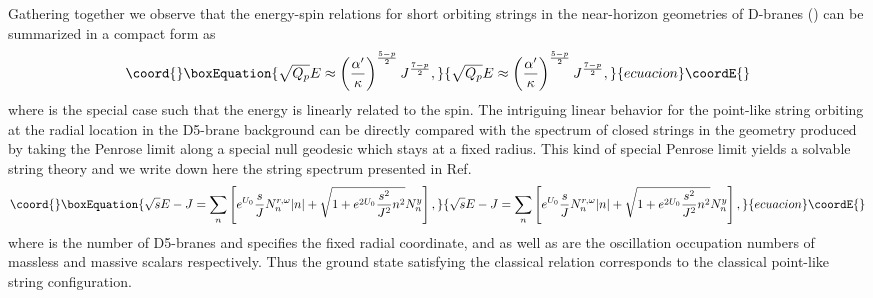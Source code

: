 \documentclass[12pt,a4paper]{article}
\providecommand{\ka}{\kappa}
\begin{document}
Gathering together we observe that the energy-spin relations for short
orbiting strings in the near-horizon geometries of D\coordHE{}-branes
(\coordHE{}) can be summarized in a compact form as
\begin{equation}\coord{}\boxEquation{
\sqrt{Q_p}E \approx \left(\frac{\alpha'}{\ka}\right)^{\frac{5-p}{2}}
J^{\frac{7-p}{2}},
}{
\sqrt{Q_p}E \approx \left(\frac{\alpha'}{\ka}\right)^{\frac{5-p}{2}}
J^{\frac{7-p}{2}},
}{ecuacion}\coordE{}\end{equation}
where \coordHE{} is the special case such that the energy is linearly related
to the spin. The intriguing linear behavior \coordHE{}
for the point-like string orbiting at the radial location \coordHE{}
in the D5-brane background can be directly compared with the
spectrum of closed strings in the geometry produced by taking the
Penrose limit along a special null geodesic which stays at a fixed 
radius. This kind of special Penrose limit yields a solvable string
theory and we write down here the string spectrum presented 
in Ref. \cite{OS}
\begin{equation}\coord{}\boxEquation{
\sqrt{s}E - J = \sum_n \left[ e^{U_0} \frac{s}{J}N_n^{r,\omega}|n| +
\sqrt{1+e^{2U_0}\frac{s^2}{J^2}n^2}N_n^y \right],
}{
\sqrt{s}E - J = \sum_n \left[ e^{U_0} \frac{s}{J}N_n^{r,\omega}|n| +
\sqrt{1+e^{2U_0}\frac{s^2}{J^2}n^2}N_n^y \right],
}{ecuacion}\coordE{}\end{equation}
where \coordHE{} is the number of D5-branes and \coordHE{} specifies the
fixed radial coordinate, and \coordHE{} as well as \coordHE{}
are the oscillation occupation numbers of massless and massive 
scalars respectively. Thus the ground state satisfying the classical
relation \coordHE{} corresponds to the classical point-like 
string configuration.
\end{document}
